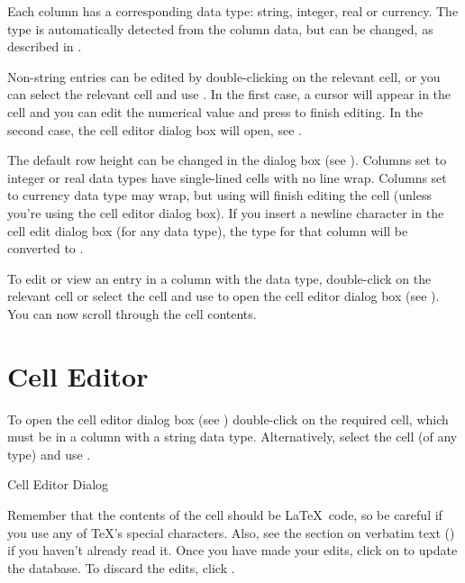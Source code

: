 Each column has a corresponding data type: string, integer, real
or currency. The type is automatically detected from the column data,
but can be changed, as described in .

Non-string entries can be edited by double-clicking on the relevant cell, 
or you can select the relevant cell and use .
In the first case, a cursor will appear in the cell and you 
can edit the numerical value and press  to finish 
editing. In the second case, the cell editor dialog box will 
open, see .

 The default row height can be changed in the
 dialog box (see ).
Columns set to integer or real data types have single-lined cells with no
line wrap. Columns set to currency data type may wrap, but using 
 will finish editing the cell (unless you're using the cell
editor dialog box). If you insert a newline character in the cell
edit dialog box (for any data type), the type for that column will 
be converted to .

To edit or view an entry in a column
with the  data type, double-click on the relevant cell or 
select the cell and use  to open the cell editor 
dialog box (see ). You can now scroll through
the cell contents.

\section{Cell Editor}\label{sec:celleditor}

To open the cell editor dialog box (see )
double-click on the required cell, which must be in a column with a 
string data type. Alternatively, select the cell (of any type) and use 
.

 {%
 }
 {Cell Editor Dialog}

Remember that the contents of the cell should be \LaTeX\ code, so be
careful if you use any of \TeX's special characters. Also, see the
section on verbatim text () if you haven't 
already read it.
Once you have made your edits, click on 
to update the database. To discard the edits, click 
.

